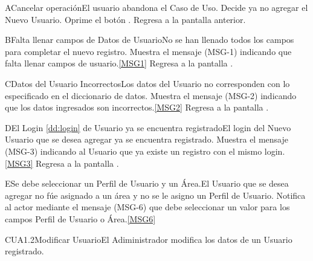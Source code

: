 	\begin{UCtrayectoriaA}{A}{Cancelar operación}{El usuario abandona el Caso de Uso.}
			\UCpaso[\UCactor] Decide ya no agregar el Nuevo Usuario.
			\UCpaso[\UCactor] Oprime el botón .
			\UCpaso Regresa a la pantalla anterior.
	\end{UCtrayectoriaA}

	\begin{UCtrayectoriaA}{B}{Falta llenar campos de Datos de Usuario}{No se han llenado todos los campos para completar el nuevo registro.}
			\UCpaso Muestra el mensaje (MSG-1) indicando que falta llenar campos de usuario.\ref{MSG1} 
			\UCpaso Regresa a la pantalla .
	\end{UCtrayectoriaA}

	\begin{UCtrayectoriaA}{C}{Datos del Usuario Incorrectos}{Los datos del Usuario no corresponden con lo especificado en el diccionario de datos.}
			\UCpaso Muestra el mensaje (MSG-2) indicando que los datos ingresados son incorrectos.\ref{MSG2}
			\UCpaso Regresa a la pantalla .
	\end{UCtrayectoriaA}

		\begin{UCtrayectoriaA}{D}{El Login \ref{dd:login} de Usuario ya se encuentra registrado}{El login del Nuevo Usuario que se desea agregar ya se encuentra registrado.}
			\UCpaso Muestra el mensaje (MSG-3) indicando al Usuario que ya existe un registro con el mismo login.\ref{MSG3}
			\UCpaso Regresa a la pantalla .
		\end{UCtrayectoriaA}

		\begin{UCtrayectoriaA}{E}{Se debe seleccionar un Perfil de Usuario y un Área.}{El Usuario que se desea agregar no fúe asignado a un área y no se le asigno un Perfil de Usuario.}	
			\UCpaso Notifica al actor mediante el mensaje (MSG-6) que debe seleccionar un valor para los campos Perfil de Usuario o Área.\ref{MSG6}
		\end{UCtrayectoriaA}



	\begin{UseCase}{CUA1.2}{Modificar Usuario}{El Adiministrador modifica los datos de un Usuario registrado.}
	\end{UseCase}

